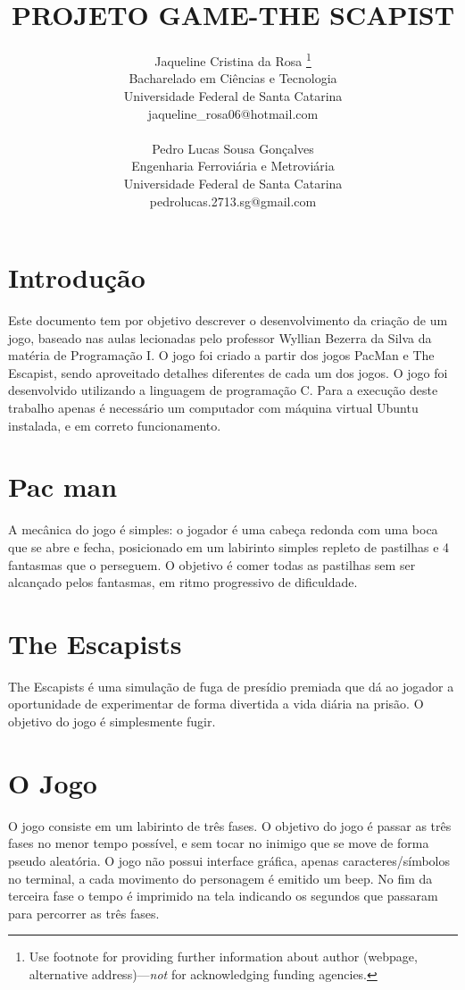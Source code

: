 \documentclass[journal]{IEEEtran}
\title                                                {PROJETO GAME-THE SCAPIST}{}
\author{
  Jaqueline Cristina da Rosa  \thanks{Use footnote for providing further
    information about author (webpage, alternative
    address)---\emph{not} for acknowledging funding agencies.} \\
  Bacharelado em Ciências e Tecnologia \\
  Universidade Federal de Santa Catarina\\
  jaqueline_rosa06@hotmail.com\\
  \texttt{}
   \And
 \\Pedro Lucas Sousa Gonçalves \\
  Engenharia Ferroviária e Metroviária\\
  Universidade Federal de Santa Catarina\\
  pedrolucas.2713.sg@gmail.com \\
  \texttt{}
}
\begin{document}
\maketitle
\IEEEdisplaynontitleabstractindextext
\IEEEpeerreviewmaketitle


\section{Introdução}
Este documento tem por objetivo descrever o desenvolvimento da criação de um jogo, baseado nas aulas lecionadas pelo professor Wyllian Bezerra da Silva da matéria de Programação I. O jogo foi criado a partir dos jogos PacMan e The Escapist, sendo aproveitado detalhes diferentes de cada um dos jogos. O jogo foi desenvolvido utilizando a linguagem de programação C. Para a execução deste trabalho apenas é necessário um computador com máquina virtual Ubuntu instalada, e em correto funcionamento. 

\section{Pac man}
A mecânica do jogo é simples: o jogador é uma cabeça redonda com uma boca que se abre e fecha, posicionado em um labirinto simples repleto de pastilhas e 4 fantasmas que o perseguem. O objetivo é comer todas as pastilhas sem ser alcançado pelos fantasmas, em ritmo progressivo de dificuldade. 


\section{The Escapists}
The Escapists é uma simulação de fuga de presídio premiada que dá ao jogador a oportunidade de experimentar de forma divertida a vida diária na prisão. O objetivo do jogo é simplesmente fugir. 

\section{O Jogo}
O jogo consiste em um labirinto de três fases. O objetivo do jogo é passar as três fases no menor tempo possível, e sem tocar no inimigo que se move de forma pseudo aleatória. O jogo não possui interface gráfica, apenas caracteres/símbolos no terminal, a cada movimento do personagem é emitido um beep. No fim da terceira fase o tempo é imprimido na tela indicando os segundos que passaram para percorrer as três fases. 
 
\end{document}
